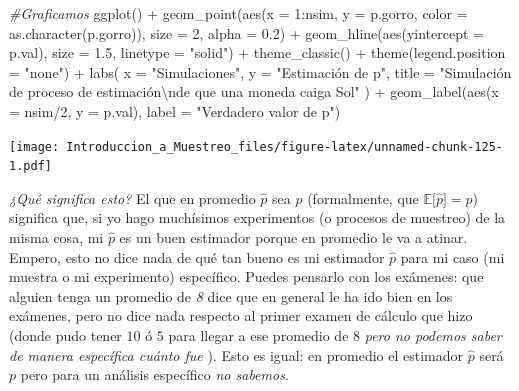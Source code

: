 \documentclass[
]{book}
\newenvironment{Shaded}{\begin{snugshade}}{\end{snugshade}}
\newcommand{\AttributeTok}[1]{\textcolor[rgb]{0.77,0.63,0.00}{#1}}
\newcommand{\CommentTok}[1]{\textcolor[rgb]{0.56,0.35,0.01}{\textit{#1}}}
\newcommand{\DecValTok}[1]{\textcolor[rgb]{0.00,0.00,0.81}{#1}}
\newcommand{\FloatTok}[1]{\textcolor[rgb]{0.00,0.00,0.81}{#1}}
\newcommand{\FunctionTok}[1]{\textcolor[rgb]{0.00,0.00,0.00}{#1}}
\newcommand{\NormalTok}[1]{#1}
\newcommand{\SpecialCharTok}[1]{\textcolor[rgb]{0.00,0.00,0.00}{#1}}
\newcommand{\StringTok}[1]{\textcolor[rgb]{0.31,0.60,0.02}{#1}}
\begin{document}
\begin{Shaded}
\begin{Highlighting}[]
\CommentTok{\#Graficamos}
\FunctionTok{ggplot}\NormalTok{() }\SpecialCharTok{+}
  \FunctionTok{geom\_point}\NormalTok{(}\FunctionTok{aes}\NormalTok{(}\AttributeTok{x =} \DecValTok{1}\SpecialCharTok{:}\NormalTok{nsim, }\AttributeTok{y =}\NormalTok{ p.gorro, }\AttributeTok{color =} \FunctionTok{as.character}\NormalTok{(p.gorro)), }
             \AttributeTok{size =} \DecValTok{2}\NormalTok{, }\AttributeTok{alpha =} \FloatTok{0.2}\NormalTok{) }\SpecialCharTok{+}
  \FunctionTok{geom\_hline}\NormalTok{(}\FunctionTok{aes}\NormalTok{(}\AttributeTok{yintercept =}\NormalTok{ p.val), }\AttributeTok{size =} \FloatTok{1.5}\NormalTok{, }\AttributeTok{linetype =} \StringTok{"solid"}\NormalTok{) }\SpecialCharTok{+}
  \FunctionTok{theme\_classic}\NormalTok{() }\SpecialCharTok{+}
  \FunctionTok{theme}\NormalTok{(}\AttributeTok{legend.position =} \StringTok{"none"}\NormalTok{) }\SpecialCharTok{+} 
  \FunctionTok{labs}\NormalTok{(}
    \AttributeTok{x =} \StringTok{"Simulaciones"}\NormalTok{,}
    \AttributeTok{y =} \StringTok{"Estimación de p"}\NormalTok{,}
    \AttributeTok{title =} \StringTok{"Simulación de proceso de estimación}\SpecialCharTok{\textbackslash{}n}\StringTok{de que una moneda caiga Sol"}
\NormalTok{  ) }\SpecialCharTok{+}
  \FunctionTok{geom\_label}\NormalTok{(}\FunctionTok{aes}\NormalTok{(}\AttributeTok{x =}\NormalTok{ nsim}\SpecialCharTok{/}\DecValTok{2}\NormalTok{, }\AttributeTok{y =}\NormalTok{ p.val), }\AttributeTok{label =} \StringTok{"Verdadero valor de p"}\NormalTok{)}
\end{Highlighting}
\end{Shaded}

\texttt{[image: Introduccion\_a\_Muestreo\_files/figure-latex/unnamed-chunk-125-1.pdf]}

\emph{¿Qué significa esto?} El que en promedio \(\hat{p}\) sea \(p\) (formalmente, que \(\mathbb{E}\big[\hat{p}\big] = p\)) significa que, si yo hago muchísimos experimentos (o procesos de muestreo) de la misma cosa, mi \(\hat{p}\) es un buen estimador porque en promedio le va a atinar. Empero, esto no dice nada de qué tan bueno es mi estimador \(\hat{p}\) para mi caso (mi muestra o mi experimento) específico. Puedes pensarlo con los exámenes: que alguien tenga un promedio de \emph{8} dice que en general le ha ido bien en los exámenes, pero no dice nada respecto al primer examen de cálculo que hizo (donde pudo tener \(10\) ó \(5\) para llegar a ese promedio de \(8\) \emph{pero no podemos saber de manera específica cuánto fue} ). Esto es igual: en promedio el estimador \(\hat{p}\) será \(p\) pero para un análisis específico \emph{no sabemos}.
\end{document}
